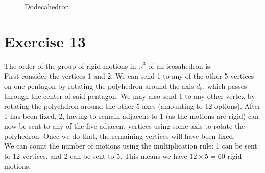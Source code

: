 \documentclass{article}
\newcommand{\R}{\mathbb{R}}
\begin{document}
\begin{figure}[H]
        \caption{\label{fig:figure1} Dodecahedron.}
    \end{figure}


    \section*{Exercise 13}
    The order of the group of rigid motions in $\R^3$ of an icosahedron is: \\
    First consider the vertices 1 and 2.
    We can send 1 to any of the other 5 vertices on one pentagon by
    rotating the polyhedron around the axis $d_5$, which passes through
    the center of said pentagon. We may also send 1 to any other vertex
    by rotating the polyehdron around the other 5 axes (amounting to 12 
    options).
    After 1 has been fixed, 2, having to remain adjacent to 1 (as the
    motions are rigid) can now be sent to any of the five adjacent vertices
    using some axis to rotate the polyhedron. Once we do that, the
    remaining vertices will have been fixed. \\
    We can count the number of motions using the multiplication rule:
    1 can be sent to 12 vertices, and 2 can be sent to 5. This means we
    have $12 \times 5 = 60$ rigid motions. 
\end{document}

